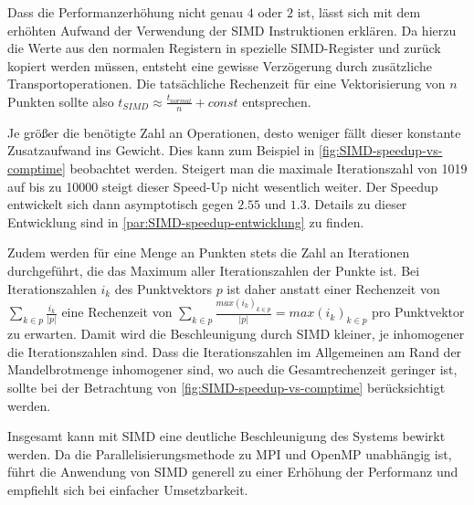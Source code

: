 Dass die Performanzerhöhung nicht genau $4$ oder $2$ ist, lässt sich mit dem erhöhten Aufwand der Verwendung
der SIMD Instruktionen erklären.
Da hierzu die Werte aus den normalen Registern in spezielle SIMD-Register und zurück
kopiert werden müssen, entsteht eine gewisse Verzögerung durch zusätzliche Transportoperationen.
Die tatsächliche Rechenzeit für eine Vektorisierung von \(n\) Punkten sollte also \(t_{SIMD} \approx \frac{t_{normal}}{n}+ const\) entsprechen.

Je größer die benötigte Zahl an Operationen, desto weniger fällt dieser konstante Zusatzaufwand ins Gewicht.
Dies kann zum Beispiel in \autoref{fig:SIMD-speedup-vs-comptime} beobachtet werden.
Steigert man die maximale Iterationszahl von 1019 auf bis zu 10000 steigt dieser Speed-Up nicht wesentlich weiter.
Der Speedup entwickelt sich dann asymptotisch gegen $2.55$ und $1.3$. Details zu dieser Entwicklung sind in \autoref{par:SIMD-speedup-entwicklung} zu finden.

Zudem werden für eine Menge an Punkten stets die Zahl an Iterationen durchgeführt,
die das Maximum aller Iterationszahlen der Punkte ist.
Bei Iterationszahlen \(i_k\) des Punktvektors \(p\) ist daher
anstatt einer Rechenzeit von \(\sum_{k \in p} \frac{i_k }{ | p | }\) eine Rechenzeit von
\(\sum_{k \in p} \frac{max(i_k)_{k \in p }}{|p|} = max(i_k)_{k \in p }\) pro Punktvektor zu erwarten.
Damit wird die Beschleunigung durch SIMD kleiner, je inhomogener die Iterationszahlen sind.
Dass die Iterationszahlen im Allgemeinen am Rand der Mandelbrotmenge inhomogener sind,
wo auch die Gesamtrechenzeit geringer ist, sollte bei der Betrachtung von \autoref{fig:SIMD-speedup-vs-comptime} berücksichtigt werden.


Insgesamt kann mit SIMD eine deutliche Beschleunigung des Systems bewirkt werden.
Da die Parallelisierungsmethode zu MPI und OpenMP unabhängig ist, führt die Anwendung von SIMD generell
zu einer Erhöhung der Performanz und empfiehlt sich bei einfacher Umsetzbarkeit.

